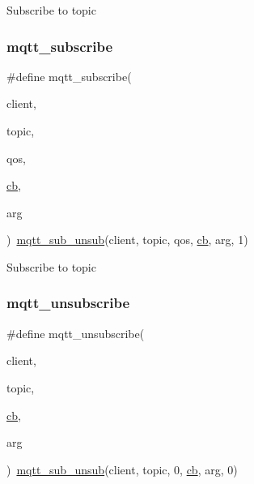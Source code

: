 Subscribe to topic \mbox{\label{group__mqtt_ga83d6a6d811b201a74d793bc1b5d4e029}} 
\subsubsection{\texorpdfstring{mqtt\+\_\+subscribe}{mqtt\_subscribe}\hspace{0.1cm}{\footnotesize\ttfamily [2/2]}}
{\footnotesize\ttfamily \#define mqtt\+\_\+subscribe(\begin{DoxyParamCaption}\item[{}]{client,  }\item[{}]{topic,  }\item[{}]{qos,  }\item[{}]{\hyperlink{periph__rtt_2main_8c_afd4145001d494db2ea612e1239724148}{cb},  }\item[{}]{arg }\end{DoxyParamCaption})~\hyperlink{openmote-cc2538_2lwip_2src_2include_2lwip_2apps_2mqtt_8h_afdb39d4a9758f98c02451aaa9a9b3103}{mqtt\+\_\+sub\+\_\+unsub}(client, topic, qos, \hyperlink{periph__rtt_2main_8c_afd4145001d494db2ea612e1239724148}{cb}, arg, 1)}

Subscribe to topic \mbox{\label{group__mqtt_ga0f133ef09cbe56c46ebe2cc21afccf3f}} 
\subsubsection{\texorpdfstring{mqtt\+\_\+unsubscribe}{mqtt\_unsubscribe}\hspace{0.1cm}{\footnotesize\ttfamily [1/2]}}
{\footnotesize\ttfamily \#define mqtt\+\_\+unsubscribe(\begin{DoxyParamCaption}\item[{}]{client,  }\item[{}]{topic,  }\item[{}]{\hyperlink{periph__rtt_2main_8c_afd4145001d494db2ea612e1239724148}{cb},  }\item[{}]{arg }\end{DoxyParamCaption})~\hyperlink{openmote-cc2538_2lwip_2src_2include_2lwip_2apps_2mqtt_8h_afdb39d4a9758f98c02451aaa9a9b3103}{mqtt\+\_\+sub\+\_\+unsub}(client, topic, 0, \hyperlink{periph__rtt_2main_8c_afd4145001d494db2ea612e1239724148}{cb}, arg, 0)}

